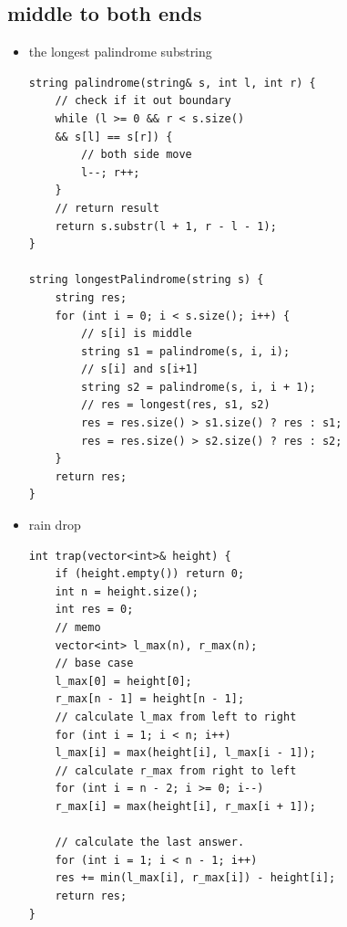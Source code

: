 \documentclass[a4paper,11pt,twoside]{book}
\begin{document}
\subsection{middle to both ends}
\begin{itemize}
	\item the longest palindrome substring
	
\begin{lstlisting}[breaklines]
string palindrome(string& s, int l, int r) {
	// check if it out boundary
	while (l >= 0 && r < s.size()
	&& s[l] == s[r]) {
		// both side move
		l--; r++;
	}
	// return result
	return s.substr(l + 1, r - l - 1);
}

string longestPalindrome(string s) {
	string res;
	for (int i = 0; i < s.size(); i++) {
		// s[i] is middle
		string s1 = palindrome(s, i, i);
		// s[i] and s[i+1] 
		string s2 = palindrome(s, i, i + 1);
		// res = longest(res, s1, s2)
		res = res.size() > s1.size() ? res : s1;
		res = res.size() > s2.size() ? res : s2;
	}
	return res;
}
\end{lstlisting}
	
	\item rain drop
	
\begin{lstlisting}[breaklines]
int trap(vector<int>& height) {
	if (height.empty()) return 0;
	int n = height.size();
	int res = 0;
	// memo
	vector<int> l_max(n), r_max(n);
	// base case
	l_max[0] = height[0];
	r_max[n - 1] = height[n - 1];
	// calculate l_max from left to right
	for (int i = 1; i < n; i++)
	l_max[i] = max(height[i], l_max[i - 1]);
	// calculate r_max from right to left
	for (int i = n - 2; i >= 0; i--) 
	r_max[i] = max(height[i], r_max[i + 1]);
	
	// calculate the last answer.
	for (int i = 1; i < n - 1; i++) 
	res += min(l_max[i], r_max[i]) - height[i];
	return res;
}
\end{lstlisting}

\end{itemize}
\end{document}
